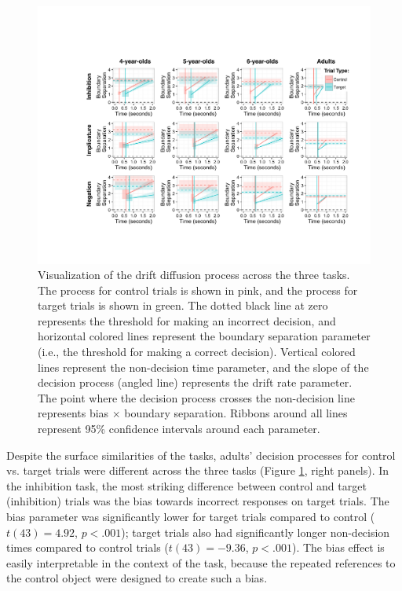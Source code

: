 \documentclass[man, noapacite]{apa2}
\begin{document}
\begin{figure}[t!]
\begin{center}
\includegraphics[width=\textwidth]{figures/ddm_vis.pdf}
\caption{\label{fig:ddm} Visualization of the drift diffusion process across the three tasks. The process for control trials is shown in pink, and the process for target trials is shown in green. The dotted black line at zero represents the threshold for making an incorrect decision, and horizontal colored lines represent the boundary separation parameter (i.e., the threshold for making a correct decision). Vertical colored lines represent the non-decision time parameter, and the slope of the decision process (angled line) represents the drift rate parameter. The point where the decision process crosses the non-decision line represents bias $\times$ boundary separation. Ribbons around all lines represent 95\% confidence intervals around each parameter.}
\end{center}
\end{figure}

Despite the surface similarities of the tasks, adults' decision processes for control vs. target trials were different across the three tasks (Figure \ref{fig:ddm}, right panels). In the inhibition task, the most striking difference between control and target (inhibition) trials was the bias towards incorrect responses on target trials. The bias parameter was significantly lower for target trials compared to control ($t(43) = 4.92$, $p< .001$); target trials also had significantly longer non-decision times compared to control trials ($t(43) = -9.36$, $p< .001$). The bias effect is easily interpretable in the context of the task, because the repeated references to the control object were designed to create such a bias.
\end{document}
